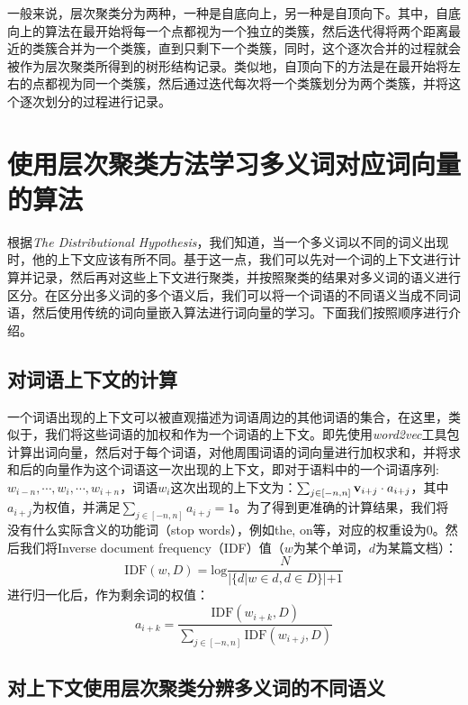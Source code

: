 一般来说，层次聚类分为两种，一种是自底向上，另一种是自顶向下。其中，自底向上的算法在最开始将每一个点都视为一个独立的类簇，然后迭代得将两个距离最近的类簇合并为一个类簇，直到只剩下一个类簇，同时，这个逐次合并的过程就会被作为层次聚类所得到的树形结构记录。类似地，自顶向下的方法是在最开始将左右的点都视为同一个类簇，然后通过迭代每次将一个类簇划分为两个类簇，并将这个逐次划分的过程进行记录。

\section{使用层次聚类方法学习多义词对应词向量的算法}

根据\emph{The Distributional Hypothesis}，我们知道，当一个多义词以不同的词义出现时，他的上下文应该有所不同。基于这一点，我们可以先对一个词的上下文进行计算并记录，然后再对这些上下文进行聚类，并按照聚类的结果对多义词的语义进行区分。在区分出多义词的多个语义后，我们可以将一个词语的不同语义当成不同词语，然后使用传统的词向量嵌入算法进行词向量的学习。下面我们按照顺序进行介绍。

\subsection{对词语上下文的计算}

一个词语出现的上下文可以被直观描述为词语周边的其他词语的集合，在这里，类似于\citep{huang2012improving}，我们将这些词语的加权和作为一个词语的上下文。即先使用\emph{word2vec}工具包计算出词向量，然后对于每个词语，对他周围词语的词向量进行加权求和，并将求和后的向量作为这个词语这一次出现的上下文，即对于语料中的一个词语序列:$w_{i-n}, \cdots,w_{i}, \cdots, w_{i+n}$，词语$w_i$这次出现的上下文为：$\sum_{j \in [-n, n]} {{\mathbf v}}_{i+j} \cdot a_{i+j}$，其中$a_{i+j}$为权值，并满足$\sum_{j \in [-n, n]} a_{i+j} = 1$。为了得到更准确的计算结果，我们将没有什么实际含义的功能词（stop words），例如the, on等，对应的权重设为0。然后我们将Inverse document frequency（IDF）值（$w$为某个单词，$d$为某篇文档）：
\begin{equation*}
\mathrm{IDF}(w, D) = \mathrm{log} \frac{N}{|\{d | w \in d, d \in D\}| + 1}
\end{equation*}
进行归一化后，作为剩余词的权值：
\begin{equation*}
a_{i+k} = \frac{\mathrm{IDF}(w_{i+k}, D)}{\sum_{j \in [-n, n]} \mathrm{IDF}(w_{i+j}, D)}
\end{equation*}

\subsection{对上下文使用层次聚类分辨多义词的不同语义}

